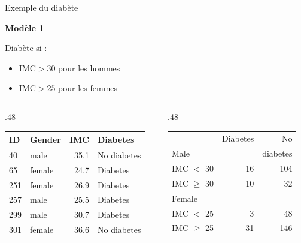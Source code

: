 \begin{frame}{Exemple du diabète}

  \textbf{Modèle 1}

  Diabète si :
  \begin{itemize}
    \item $\mbox{IMC} > 30$ pour les hommes 
    \item $\mbox{IMC} > 25$ pour les femmes 
  \end{itemize}

  \begin{overprint}

      \begin{columns}
        \begin{column}{.48\textwidth}
          
          {\scriptsize
          \begin{tabular}{llrl}
            \toprule
            ID &  Gender &   IMC &     Diabetes \\
            \midrule
            40             &    male &  35.1 &  No diabetes \\
            65             &  female &  24.7 &     Diabetes \\
            251            &  female &  26.9 &     Diabetes \\
            257            &    male &  25.5 &     Diabetes \\
            299            &    male &  30.7 &     Diabetes \\
            301            &  female &  36.6 &  No diabetes \\
            \bottomrule
          \end{tabular}}
      
      \end{column}    
      
      \begin{column}{.48\textwidth}
        {
          \scriptsize
          \begin{tabular}{lrr}
            \toprule
                          &  Diabetes &  No          \\
            Male              &           &  diabetes    \\
            \midrule
            IMC $<$ 30    &        16 &          104  \\
            IMC $\geq$ 30 &        10 &           32  \\
            \bottomrule
            Female              &           &      \\
            \midrule
            IMC $<$ 25    &        3 &          48  \\
            IMC $\geq$ 25 &        31 &         146  \\
            \bottomrule
          \end{tabular}

}
\end{column}
\end{columns}
\end{overprint}
\end{frame}
